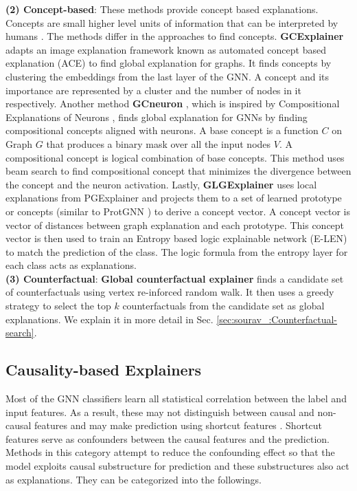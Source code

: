 \textbf{(2) Concept-based}: These methods provide concept based explanations. Concepts are small higher level units of information that can be interpreted by humans \cite{automatic_concept}. The methods differ in the approaches to find concepts. \textbf{GCExplainer} \cite{global_concept_ex} adapts an image explanation framework known as automated concept based explanation (ACE) \cite{automatic_concept} to find global explanation for graphs. It finds concepts by clustering the embeddings from the last layer of the GNN. A concept and its importance are represented by a cluster and the number of nodes in it respectively. Another method \textbf{GCneuron } \cite{Global_neuron}, which is inspired by Compositional Explanations of Neurons \cite{Neuron-compositional}, finds global explanation for GNNs by finding compositional concepts aligned with neurons. A base concept is a function \(C\) on Graph \(G\) that produces a binary mask over all the input nodes \(V\). A compositional concept is logical combination of base concepts. This method uses beam search to find compositional concept that minimizes the divergence between the concept and the neuron activation. Lastly, \textbf{GLGExplainer} \cite{global_logic} uses local explanations from PGExplainer \cite{pgexplainer} and projects them to a set of learned prototype or concepts (similar to ProtGNN \cite{protgnn}) to derive a concept vector. A concept vector is vector of distances between graph explanation and each prototype. This concept vector is then used to train an Entropy based logic explainable network (E-LEN) \cite{logic-LEN} to match the prediction of the class. The logic formula from the entropy layer for each class acts as explanations.\\
\noindent
\textbf{(3) Counterfactual}: \textbf{Global counterfactual explainer} \cite{Global-counter} finds a candidate set of counterfactuals using vertex re-inforced random walk. It then uses a greedy strategy to select the top $k$ counterfactuals from the candidate set as global explanations. We explain it in more detail in Sec. \ref{sec:sourav_:Counterfactual-search}. %

\subsection{Causality-based Explainers}
Most of the GNN classifiers learn all statistical correlation between the label and input features. As a result, these may not distinguish between causal and non-causal features and may make prediction using shortcut features \cite{causal-attention}. Shortcut features serve as confounders between the causal features and the prediction. Methods in this category attempt to reduce the confounding effect so that the model exploits causal substructure for prediction and these substructures also act as explanations. They can be categorized into the followings.

